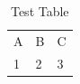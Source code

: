 \documentclass[sn-mathphys]{sn-jnl}
\begin{document}
\begin{table}[t]
\caption{Test Table}
\begin{tabular}{lll}
A & B & C \\
1 & 2 & 3 \\
\end{tabular}
\end{table}
\end{document}
